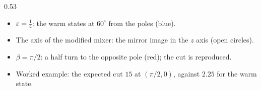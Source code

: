 \documentclass[handoutsbeamer.tex]{subfiles}
\begin{document}
\begin{frame}
{\begin{columns}[c]
\begin{column}{0.53\textwidth}
\begin{itemize}
    \item $\varepsilon = \frac14$: the warm states at $60^\circ$ from the poles (blue).
    \item The axis of the modified mixer: the mirror image in the $z$ axis (open circles).
    \item $\beta = \pi/2$: a half turn to the opposite pole (red); the cut is reproduced.
    \item Worked example: the expected cut $15$ at $(\pi/2,0)$, against $2.25$ for the warm state.
\end{itemize}\end{column}\end{columns}}
\end{frame}

\end{document}
